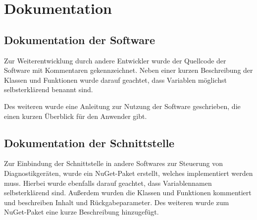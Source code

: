 \section{Dokumentation}
\label{sec:Dokumentation}

\subsection{Dokumentation der Software}
\label{sec:DokumentationSoftware}
Zur Weiterentwicklung durch andere Entwickler wurde der Quellcode der Software mit Kommentaren gekennzeichnet. Neben einer kurzen Beschreibung der Klassen und Funktionen wurde darauf geachtet, dass Variablen möglichst selbsterklärend benannt sind.

Des weiteren wurde eine Anleitung zur Nutzung der Software geschrieben, die einen kurzen Überblick für den Anwender gibt.

\subsection{Dokumentation der Schnittstelle}
\label{sec:DokumentationSchnittstelle}
Zur Einbindung der Schnittstelle in andere Softwares zur Steuerung von Diagnostikgeräten, wurde ein {\acs{NuGet}}-Paket erstellt, welches implementiert werden muss. Hierbei wurde ebenfalls darauf geachtet, dass Variablennamen selbsterklärend sind. Außerdem wurden die Klassen und Funktionen kommentiert und beschreiben Inhalt und Rückgabeparameter. Des weiteren wurde zum {\acs{NuGet}}-Paket eine kurze Beschreibung hinzugefügt.